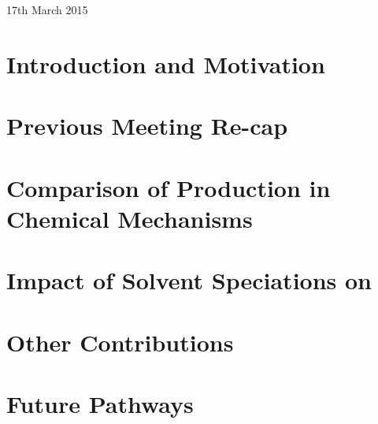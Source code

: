 \documentclass[center]{beamer}
\begin{document}


\begin{frame} %
    \vspace{3cm}
    {\Large \textcolor{\highlightcolor}{\textbf{\slidesettitle}}}\\ 
    \vspace{1cm}
    {\Large \textcolor{GreyIASS}{\textbf{\authorname}}} \\
    \vspace{.5cm}
    {\large \textcolor{GreyIASS}{17th March 2015}} 
\end{frame}



\section{Introduction and Motivation}


\section{Previous Meeting Re-cap}


\section{Comparison of  Production in Chemical Mechanisms}


\section{Impact of Solvent Speciations on }


\section{Other Contributions}


\section{Future Pathways}


% 
\end{document}
